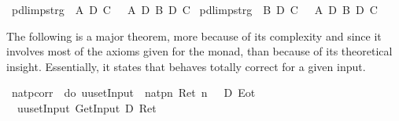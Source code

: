 \begin{isabellebody}
\isamarkupfalse%
\isamarkupfalse%
\isamarkupfalse%
\isamarkupfalse%
\isamarkupfalse%
\isamarkupfalse%
\isamarkupfalse%
\isamarkupfalse%
\isamarkupfalse%
\isamarkupfalse%
\isamarkupfalse%
\isamarkupfalse%
\isamarkupfalse%
\isamarkupfalse%
\isanewline
\isanewline
\isamarkupfalse%
\ pdl{\isacharunderscore}imp{\isacharunderscore}strg{}{\isacharcolon}\ {\isachardoublequote}{\isasymturnstile}\ A\ {\isasymlongrightarrow}\isactrlsub D\ C\ {\isasymLongrightarrow}\ {\isasymturnstile}\ A\ {\isasymand}\isactrlsub D\ B\ {\isasymlongrightarrow}\isactrlsub D\ C{\isachardoublequote}\isamarkupfalse%
\isamarkupfalse%
\isamarkupfalse%
\isamarkupfalse%
\isamarkupfalse%
\isamarkupfalse%
\isamarkupfalse%
\isanewline
\isamarkupfalse%
\ pdl{\isacharunderscore}imp{\isacharunderscore}strg{}{\isacharcolon}\ {\isachardoublequote}{\isasymturnstile}\ B\ {\isasymlongrightarrow}\isactrlsub D\ C\ {\isasymLongrightarrow}\ {\isasymturnstile}\ A\ {\isasymand}\isactrlsub D\ B\ {\isasymlongrightarrow}\isactrlsub D\ C{\isachardoublequote}\isamarkupfalse%
\isamarkupfalse%
\isamarkupfalse%
\isamarkupfalse%
\isamarkupfalse%
\isamarkupfalse%
\isamarkupfalse%
\isamarkupfalse%
%
\isamarkuptrue%
%
\begin{isamarkuptext}%
The following is a major theorem, more because of its complexity and since it 
  involves most of the axioms given for the monad, than because of its
  theoretical insight. Essentially, it states that  behaves
  totally correct for a given input.
  \label{isa:natp-proof}%
\end{isamarkuptext}%
\isamarkuptrue%
\ natp{\isacharunderscore}corr{\isacharcolon}\ {\isachardoublequote}{\isasymturnstile}\ {\isasymlangle}do\ {\isacharbraceleft}uu{\isasymleftarrow}setInput\ {\isacharbrackleft}{}{\isacharbrackright}{\isacharsemicolon}\ natp{\isacharbraceright}{\isasymrangle}{\isacharparenleft}{\isasymlambda}n{\isachardot}\ Ret\ {\isacharparenleft}n\ {\isacharequal}\ {}{\isacharparenright}\ {\isasymand}\isactrlsub D\ Eot{\isacharparenright}{\isachardoublequote}\isanewline
\isamarkupfalse%
\ {\isacharminus}\isanewline
\ \ \isamarkupfalse%
\ {\isachardoublequote}{\isasymturnstile}\ {\isasymlangle}uu{\isasymleftarrow}setInput\ {\isacharbrackleft}{}{\isacharbrackright}{\isasymrangle}{\isacharparenleft}GetInput\ {\isacharequal}\isactrlsub D\ Ret\ {\isacharbrackleft}{}{\isacharbrackright}{\isacharparenright}{\isachardoublequote}\isanewline

\end{isabellebody}

